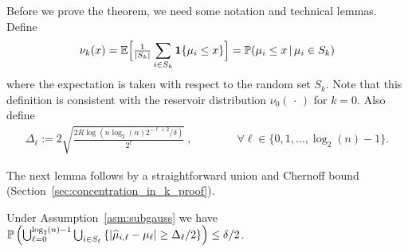 

Before we prove the theorem, we need some notation and technical lemmas.
Define 
\begin{align*}
\nu_k(x) = \E\Big[ \tfrac{1}{|S_k|} \sum_{i \in S_k} \1\{ \mu_i \leq x \} \Big] = \P( \mu_i \leq x \, | \, \mu_i \in S_k )
\end{align*}
where the expectation is taken with respect to the random set $S_k$. 
Note that this definition is consistent with the reservoir distribution $\nu_0( \, \cdot \, )$ for $k=0$.
Also define
\begin{align*}
\Delta_\ell := 2\sqrt{\frac{2R \log(n \log_2(n) 2^{-\ell+2}/\delta)}{2^\ell}} \ , \qquad\qquad \forall \ell \in \{0,1,\dots,\log_2(n)-1\}.
\end{align*}

The next lemma follows by a straightforward union and Chernoff bound (Section~\ref{sec:concentration_in_k_proof}).
\begin{lemma}\label{lem:concentration_in_k}
Under Assumption~\ref{asm:subgauss} we have
$\P\left( \bigcup_{\ell=0}^{\log_2(n)-1} \bigcup_{i \in S_{\ell}} \left\{ |\widehat{\mu}_{i,\ell} - \mu_\ell| \geq \Delta_\ell/2 \right\} \right) \leq \delta/2$.
\end{lemma}

